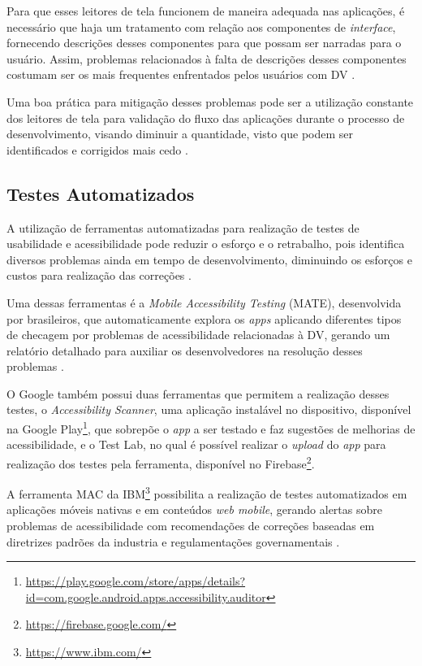 Para que esses leitores de tela funcionem de maneira adequada nas aplicações, é necessário que haja um tratamento
com relação aos componentes de \emph{interface}, fornecendo descrições desses componentes para que possam ser narradas para o usuário. Assim,
problemas relacionados à falta de descrições desses componentes costumam ser os mais frequentes enfrentados pelos usuários com DV
\cite{Vendome201941,Christoph2020,Shera2021285}.

Uma boa prática para mitigação desses problemas pode ser a utilização constante dos leitores de tela para validação do fluxo das aplicações durante
o processo de desenvolvimento, visando diminuir a quantidade, visto que podem ser identificados e corrigidos mais cedo \cite{Tomlinson2016377}.

\subsection{Testes Automatizados}

A utilização de ferramentas automatizadas para realização de testes de usabilidade e acessibilidade pode reduzir o esforço
e o retrabalho, pois identifica diversos problemas ainda em tempo de desenvolvimento, diminuindo os esforços e custos para
realização das correções \cite{Christoph2020}.

Uma dessas ferramentas é a \emph{Mobile Accessibility Testing} (MATE), desenvolvida por brasileiros, que automaticamente explora os \emph{apps}
aplicando diferentes tipos de checagem por problemas de acessibilidade relacionadas à DV, gerando um relatório detalhado para auxiliar
os desenvolvedores na resolução desses problemas \cite{Eler2018AutomatedAT}.

O Google também possui duas ferramentas que permitem a realização desses testes, o \emph{Accessibility Scanner}, uma aplicação instalável no dispositivo,
disponível na Google Play\footnote{\url{https://play.google.com/store/apps/details?id=com.google.android.apps.accessibility.auditor}}, que sobrepõe o
\emph{app} a ser testado e faz sugestões de melhorias de acessibilidade, e o Test Lab, no qual é possível realizar o \emph{upload} do \emph{app} para 
realização dos testes pela ferramenta, disponível no Firebase\footnote{\url{https://firebase.google.com/}}.

A ferramenta MAC da IBM\footnote{\url{https://www.ibm.com/}} possibilita a realização de testes automatizados em aplicações
móveis nativas e em conteúdos \emph{web mobile}, gerando alertas sobre problemas de acessibilidade com recomendações de
correções baseadas em diretrizes padrões da industria e regulamentações governamentais \cite{patil2016enhanced,Yan2019}.

